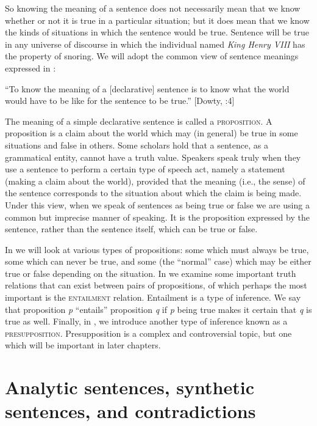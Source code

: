So knowing the meaning of a sentence does not necessarily mean that we know whether or not it is true in a particular situation; but it does mean that we know the kinds of situations in which the sentence would be true. Sentence  will be true in any universe of discourse in which the individual named \textit{King Henry VIII} has the property of snoring. We will adopt the common view of sentence meanings expressed in :


\ea \label{ex:3.2}
“To know the meaning of a [declarative] sentence is to know what the world would have to be like for the sentence to be true.”  [Dowty, \citealt{WallPeters1981}:4]
\z


The meaning of a simple declarative sentence is called a \textsc{proposition}. A proposition is a claim about the world which may (in general) be true in some situations and false in others. Some scholars hold that a sentence, as a grammatical entity, cannot have a truth value. Speakers speak truly when they use a sentence to perform a certain type of speech act, namely a statement (making a claim about the world), provided that the meaning (i.e., the sense) of the sentence corresponds to the situation about which the claim is being made. Under this view, when we speak of sentences as being true or false we are using a common but imprecise manner of speaking. It is the proposition expressed by the sentence, rather than the sentence itself, which can be true or false.



In  we will look at various types of propositions: some which must always be true, some which can never be true, and some (the “normal” case) which may be either true or false depending on the situation. In  we examine some important truth relations that can exist between pairs of propositions, of which perhaps the most important is the \textsc{entailment} relation. Entailment is a type of inference. We say that proposition \textit{p} “entails” proposition \textit{q} if \textit{p} being true makes it certain that \textit{q} is true as well. Finally, in , we introduce another type of inference known as a \textsc{presupposition}. Presupposition is a complex and controversial topic, but one which will be important in later chapters.


\section{Analytic sentences, synthetic sentences, and contradictions}\label{sec:} %


